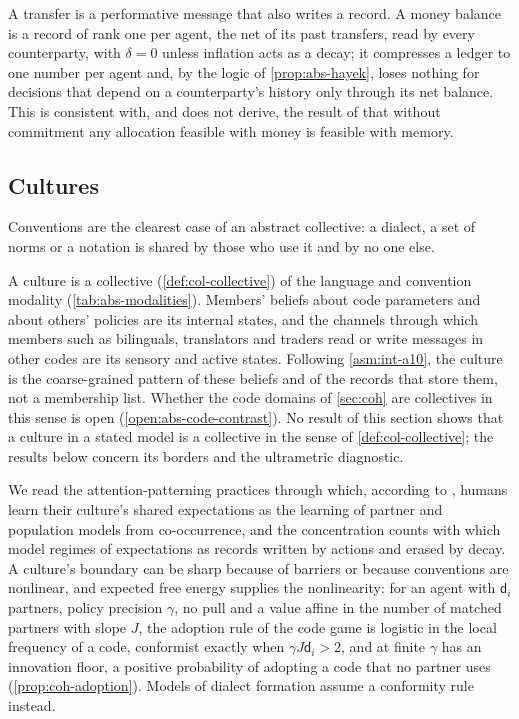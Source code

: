 \begin{remark}\label{rem:abs-money}
A transfer is a performative message that also writes a record. A money balance is a record of rank one per agent, the net of its past transfers, read by every counterparty, with $\delta=0$ unless inflation acts as a decay; it compresses a ledger to one number per agent and, by the logic of \cref{prop:abs-hayek}, loses nothing for decisions that depend on a counterparty's history only through its net balance. This is consistent with, and does not derive, the result of \citet{kocherlakota1998money} that without commitment any allocation feasible with money is feasible with memory.
\end{remark}

\subsection{Cultures}\label{sec:abs-cultures}

Conventions are the clearest case of an abstract collective: a dialect, a set of norms or a notation is shared by those who use it and by no one else.

\begin{definition}[Culture]\label{def:abs-culture}
A culture is a collective (\cref{def:col-collective}) of the language and convention modality (\cref{tab:abs-modalities}). Members' beliefs about code parameters and about others' policies are its internal states, and the channels through which members such as bilinguals, translators and traders read or write messages in other codes are its sensory and active states. Following \cref{asm:int-a10}, the culture is the coarse-grained pattern of these beliefs and of the records that store them, not a membership list. Whether the code domains of \cref{sec:coh} are collectives in this sense is open (\cref{open:abs-code-contrast}). No result of this section shows that a culture in a stated model is a collective in the sense of \cref{def:col-collective}; the results below concern its borders and the ultrametric diagnostic.
\end{definition}

We read the attention-patterning practices through which, according to \citet{veissiere2020thinking}, humans learn their culture's shared expectations as the learning of partner and population models from co-occurrence, and the concentration counts with which \citet{constant2019regimes} model regimes of expectations as records written by actions and erased by decay. A culture's boundary can be sharp because of barriers or because conventions are nonlinear, and expected free energy supplies the nonlinearity: for an agent with $\mathsf d_i$ partners, policy precision $\gamma$, no pull and a value affine in the number of matched partners with slope $J$, the adoption rule of the code game is logistic in the local frequency of a code, conformist exactly when $\gamma J\mathsf d_i>2$, and at finite $\gamma$ has an innovation floor, a positive probability of adopting a code that no partner uses (\cref{prop:coh-adoption}). Models of dialect formation assume a conformity rule instead.

